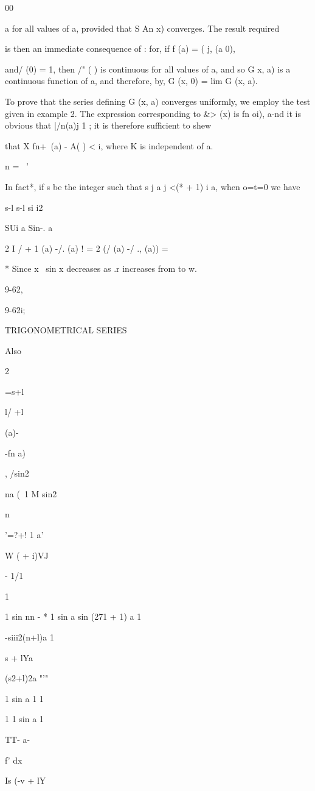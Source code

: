00

a for all values of a, provided that S An x) converges. The result
required

is then an immediate consequence of : for, if f (a) = ( j, (a
0),

and/ (0) = 1, then /" ( ) is continuous for all values of a, and so G
x, a) is a continuous function of a, and therefore, by, G (x, 0)
= lim G (x, a).

To prove that the series defining G (x, a) converges uniformly, we
employ the test given in example 2. The expression
corresponding to \&> (x) is fn oi), a-nd it is obvious that |/n(a)j 1
; it is therefore sufficient to shew

that X fn+\ (a) - A( ) < i, where K is independent of a.

n = \ '

In fact*, if s be the integer such that s j a j  <(* + 1) i a, when
o=t=0 we have

s-l s-l si i2

SUi a Sin-. a

2 I / + 1 (a) -/. (a) ! = 2 (/ (a) -/ ., (a)) =

* Since x~ sin x decreases as .r increases from to w.

9-62,

9-62i;

TRIGONOMETRICAL SERIES

Also

2

=s+l

l/ +l

(a)-

-fn a)

, /sin2

na (\ 1 M sin2

n

'=?+! 1 a'

W ( + i)VJ

- 1/1

1

1 sin nn - * 1 sin a sin (271 + 1) a 1

-siii2(n+l)a 1

  s + lYa \

 (s2+l)2a "'"

1 sin a 1 1

1 1 sin a 1

TT- a-

f' dx

Is (-v + lY

